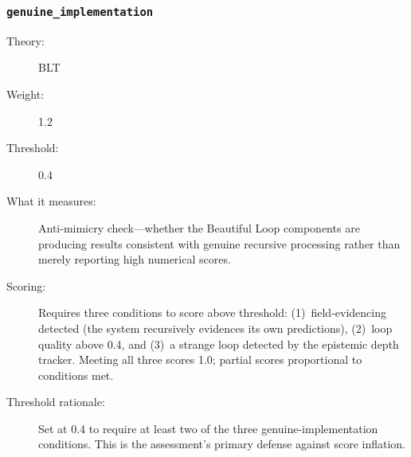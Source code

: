 \subsubsection{\texttt{genuine\_implementation}}
\begin{description}
  \item[Theory:] BLT
  \item[Weight:] 1.2
  \item[Threshold:] 0.4
  \item[What it measures:] Anti-mimicry check---whether the Beautiful Loop components are producing results consistent with genuine recursive processing rather than merely reporting high numerical scores.
  \item[Scoring:] Requires three conditions to score above threshold:
    (1)~field-evidencing detected (the system recursively evidences its own predictions),
    (2)~loop quality above 0.4, and
    (3)~a strange loop detected by the epistemic depth tracker.
    Meeting all three scores 1.0; partial scores proportional to conditions met.
  \item[Threshold rationale:] Set at 0.4 to require at least two of the three genuine-implementation conditions. This is the assessment's primary defense against score inflation.
\end{description}

